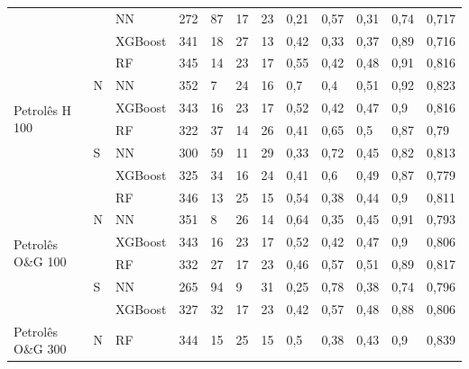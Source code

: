 \documentclass[conference]{IEEEtran}
\begin{document}
\begin{table}[t]
\begin{tabular}{llllllllllll}
                                   &                    & NN      & 272 & 87 & 17 & 23 & 0,21 & 0,57 & 0,31  & 0,74    & 0,717    \\ \cline{3-12} 
                                   &                    & XGBoost & 341 & 18 & 27 & 13 & 0,42 & 0,33 & 0,37  & 0,89    & 0,716    \\ \hline
\multirow{6}{*}{Petrolês H 100}    & \multirow{3}{*}{N} & RF      & 345 & 14 & 23 & 17 & 0,55 & 0,42 & 0,48  & 0,91    & 0,816    \\ \cline{3-12} 
                                   &                    & NN      & 352 & 7  & 24 & 16 & 0,7  & 0,4  & 0,51  & 0,92    & 0,823    \\ \cline{3-12} 
                                   &                    & XGBoost & 343 & 16 & 23 & 17 & 0,52 & 0,42 & 0,47  & 0,9     & 0,816    \\ \cline{2-12} 
                                   & \multirow{3}{*}{S} & RF      & 322 & 37 & 14 & 26 & 0,41 & 0,65 & 0,5   & 0,87    & 0,79     \\ \cline{3-12} 
                                   &                    & NN      & 300 & 59 & 11 & 29 & 0,33 & 0,72 & 0,45  & 0,82    & 0,813    \\ \cline{3-12} 
                                   &                    & XGBoost & 325 & 34 & 16 & 24 & 0,41 & 0,6  & 0,49  & 0,87    & 0,779    \\ \hline
\multirow{6}{*}{Petrolês O\&G 100} & \multirow{3}{*}{N} & RF      & 346 & 13 & 25 & 15 & 0,54 & 0,38 & 0,44  & 0,9     & 0,811    \\ \cline{3-12} 
                                   &                    & NN      & 351 & 8  & 26 & 14 & 0,64 & 0,35 & 0,45  & 0,91    & 0,793    \\ \cline{3-12} 
                                   &                    & XGBoost & 343 & 16 & 23 & 17 & 0,52 & 0,42 & 0,47  & 0,9     & 0,806    \\ \cline{2-12} 
                                   & \multirow{3}{*}{S} & RF      & 332 & 27 & 17 & 23 & 0,46 & 0,57 & 0,51  & 0,89    & 0,817    \\ \cline{3-12} 
                                   &                    & NN      & 265 & 94 & 9  & 31 & 0,25 & 0,78 & 0,38  & 0,74    & 0,796    \\ \cline{3-12} 
                                   &                    & XGBoost & 327 & 32 & 17 & 23 & 0,42 & 0,57 & 0,48  & 0,88    & 0,806    \\ \hline
\multirow{6}{*}{Petrolês O\&G 300} & \multirow{3}{*}{N} & RF      & 344 & 15 & 25 & 15 & 0,5  & 0,38 & 0,43  & 0,9     & 0,839    \\ \cline{3-12} 

\end{tabular}
\end{table}
\end{document}
